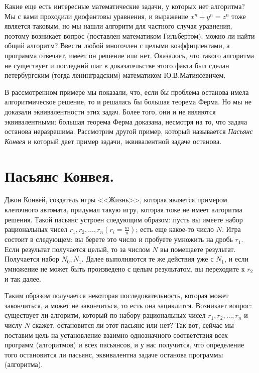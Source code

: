 \documentclass[russian]{lecture-notes}
\begin{document}
	Какие еще есть интересные математические задачи, у которых нет алгоритма? Мы с вами проходили диофантовы уравнения, и выражение $x^n + y^n = z^n$ тоже является таковым, но мы нашли алгоритм для частного случая уравнения, поэтому возникает вопрос (поставлен математиком Гильбертом): можно ли найти общий алгоритм? Ввести любой многочлен с целыми коэффициентами, а программа отвечает, имеет он решение или нет. Оказалось, что такого алгоритма не существует и последний шаг в доказательстве этого факта был сделан петербургским (тогда ленинградским) математиком Ю.В.Матиясевичем.
	
	В рассмотренном примере мы показали, что, если бы проблема останова имела алгоритмическое решение, то и решалась бы большая теорема Ферма. Но мы не доказали эквивалентности этих задач. Более того, они и не являются эквивалентными: большая теорема Ферма доказана, несмотря на то, что задача останова неразрешима.  Рассмотрим другой пример, который называется {\em Пасьянс Конвея} и который дает пример задачи, эквивалентной задаче останова.
	
	\section*{Пасьянс Конвея.}
	
	Джон Конвей, создатель игры <<Жизнь>>, которая является примером клеточного автомата, придумал такую игру, которая тоже не имеет алгоритма решения. Такой пасьянс устроен следующим образом: пусть вы имеете набор рациональных чисел $r_1, r_2, \ldots, r_n (r_i = \frac{m}{n})$; есть еще какое-то число $N$. Игра состоит в следующем: вы берете это число и пробуете умножить на дробь $r_1$. Если результат получается целый, то за числом $N$ вы помещаете результат. Получается набор $N_0, N_1$. Далее выполняются те же действия уже с $N_1$, и если умножение не может быть произведено с целым результатом, вы переходите к $r_2$ и так далее. 
	
	Таким образом получается некоторая последовательность, которая может закончиться, а может не закончиться, то есть она зациклится. Возникает вопрос: существует ли алгоритм, который по набору рациональных чисел $r_1, r_2, \ldots, r_n$ и числу $N$ скажет, остановится ли этот пасьянс или нет? Так вот, сейчас мы поставим цель на установление взаимно однозначного соответствия всех программ (алгоритмов) и всех пасьянсов, и у нас получится, что определение того остановится ли пасьянс, эквивалентна задаче останова программы (алгоритма). 
	
\end{document}
